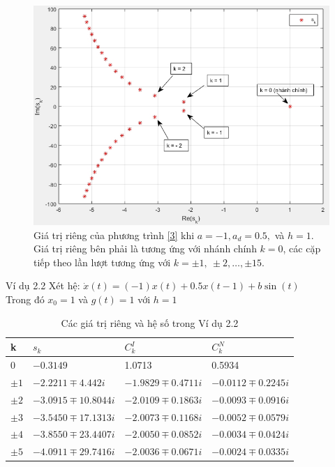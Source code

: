 \documentclass[10pt,notheorems]{beamer}
\theoremstyle{definition}
\theoremstyle{definition}
\theoremstyle{definition}
\begin{document}
\begin{frame}{}
\begin{figure}[h]
	\centering
	\includegraphics[width=0.8\linewidth]{hinh/hinh1}
	\caption{Giá trị riêng của phương trình \eqref{3} khi $a=-1, a_d=0.5,$ và $h=1$. Giá trị riêng bên phải là tương ứng với nhánh chính $k=0$, các cặp tiếp theo lần lượt tương ứng với $k=\pm 1, \ \pm 2, \dots, \pm 15$.}
	\label{refhinh1}
\end{figure}
\end{frame}

\begin{frame}
\begin{block}{Ví dụ 2.2}\label{vidu2} 
Xét hệ:  $\dot{x}(t)=(-1)x(t)+0.5x(t-1)+b\sin(t)$\\
Trong đó $x_0=1$ và $g(t)=1$ với $h=1$

\begin{table}[ht]
	\centering	
	\begin{tabular}{llll}
		\hline 
		k & $s_k$ & $C^I_k$ & $C^N_k$ \\ 
		\hline 
		0 & $-0.3149$ & 1.0713 & 0.5934 \\ 
		
		$\pm1$ & $-2.2211\mp4.442i$ & $-1.9829 \mp 0.4711i$ & $-0.0112\mp0.2245i$ \\ 
		
		$\pm2$ & $- 3.0915\mp10.8044i$ & $-2.0109 \mp 0.1863i$ & $- 0.0093\mp0.0916i$ \\ 
		
		$\pm3$ & $- 3.5450 \mp17.1313i$ & $-2.0073 \mp 0.1168i$ & $- 0.0052 \mp 0.0579i$ \\ 
		
		$\pm4$ & $-3.8550 \mp 23.4407i$ & $-2.0050 \mp 0.0852i$ & $-0.0034 \mp 0.0424i$  \\
		
		$\pm5$ & $ -4.0911 \mp 29.7416i$ & $-2.0036 \mp 0.0671i$ & $-0.0024 \mp 0.0335i$ \\
		
		\hline 
	\end{tabular}
	\caption{Các giá trị riêng và hệ số trong Ví dụ 2.2}
	\label{bang1} 
\end{table}%
\end{block}
\end{frame}
\end{document}
